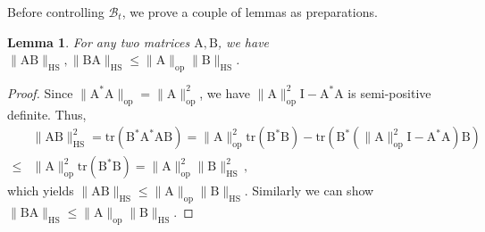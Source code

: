 \documentclass[11pt]{article}
\newtheorem{Lemma}[Theorem]{Lemma}
\numberwithin{equation}{section}
\begin{document}
Before controlling $\mathcal B_t$, we prove a couple of lemmas as preparations. 
\begin{Lemma} {\label{lemma-HS-norm-product}}
For any two matrices $\mathrm{A,B}$, we have $\| \mathrm{AB} \|_{\mathrm{HS}}, \| \mathrm{BA} \|_{\mathrm{HS}} \leq \| \mathrm{A} \|_{\mathrm{op}} \| \mathrm{B} \|_{\mathrm{HS}}$.
\end{Lemma}
\begin{proof}
Since $\| \mathrm{A^{*}A} \|_{\mathrm{op}} = \| \mathrm{A} \|_{\mathrm{op}}^2$, we have $\| \mathrm{A} \|_{\mathrm{op}}^2 \mathrm{I} - \mathrm{A^{*}A}$ is semi-positive definite. Thus,
\begin{align*}
    & \| \mathrm{AB} \|_{\mathrm{HS}}^2 = \mathrm{tr} (\mathrm{ B^{*}A^{*} AB }) = \| \mathrm{A} \|_{\mathrm{op}}^2 \mathrm{tr} (\mathrm{ B^{*} B }) - \mathrm{tr} (\mathrm{B^{*} (\| \mathrm{A} \|_{\mathrm{op}}^2 \mathrm{I} - \mathrm{A^{*}A}) B }) \\
    \leq & \| \mathrm{A} \|_{\mathrm{op}}^2 \mathrm{tr} (\mathrm{ B^{*}B }) = \| \mathrm{A} \|_{\mathrm{op}}^2 \| \mathrm{B} \|_{\mathrm{HS}}^2 \,,
\end{align*}
which yields $\| \mathrm{AB} \|_{\mathrm{HS}} \leq \| \mathrm{A} \|_{\mathrm{op}} \| \mathrm{B} \|_{\mathrm{HS}}$. Similarly we can show $\| \mathrm{BA} \|_{\mathrm{HS}} \leq \| \mathrm{A} \|_{\mathrm{op}} \| \mathrm{B} \|_{\mathrm{HS}}$.
\end{proof}
\end{document}
